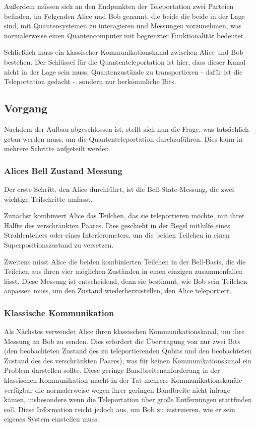Außerdem müssen sich an den Endpunkten der Teleportation zwei Parteien befinden, im Folgenden Alice und Bob genannt, die beide
die beide in der Lage sind, mit Quantensystemen zu interagieren und Messungen vorzunehmen, was normalerweise einen Quantencomputer mit begrenzter Funktionalität bedeutet.

Schließlich muss ein klassischer Kommunikationskanal zwischen Alice und Bob bestehen.
Der Schlüssel für die Quantenteleportation ist hier, dass dieser Kanal nicht in der Lage sein muss, Quantenzustände zu transportieren - dafür ist die Teleportation gedacht -, sondern nur herkömmliche Bits.


\subsection{Vorgang}\label{subsec:process}

Nachdem der Aufbau abgeschlossen ist, stellt sich nun die Frage, was tatsächlich getan werden muss, um die Quantenteleportation durchzuführen.
Dies kann in mehrere Schritte aufgeteilt werden.

\subsubsection{Alices Bell Zustand Messung}
Der erste Schritt, den Alice durchführt, ist die Bell-State-Messung, die zwei wichtige Teilschritte umfasst.

Zunächst kombiniert Alice das Teilchen, das sie teleportieren möchte, mit ihrer Hälfte des verschränkten Paares.
Dies geschieht in der Regel mithilfe eines Strahlenteilers oder eines Interferometers, um die beiden Teilchen in einen Superpositionszustand zu versetzen.

Zweitens misst Alice die beiden kombinierten Teilchen in der Bell-Basis, die die Teilchen aus ihren vier möglichen Zuständen in einen einzigen zusammenfallen lässt.
Diese Messung ist entscheidend, denn sie bestimmt, wie Bob sein Teilchen anpassen muss, um den Zustand wiederherzustellen, den
Alice teleportiert.
\subsubsection{Klassische Kommunikation}
Als Nächstes verwendet Alice ihren klassischen Kommunikationskanal, um ihre Messung an Bob zu senden.
Dies erfordert die Übertragung von nur zwei Bits (den beobachteten Zustand des zu teleportierenden Qubits und den beobachteten Zustand des
des verschränkten Paares), was für keinen Kommunikationskanal ein Problem darstellen sollte.
Diese geringe Bandbreitenanforderung in der klassischen Kommunikation macht in der Tat mehrere Kommunikationskanäle verfügbar
die normalerweise wegen ihrer geringen Bandbreite nicht infrage kämen, insbesondere wenn die Teleportation über große
Entfernungen stattfinden soll.
Diese Information reicht jedoch aus, um Bob zu instruieren, wie er sein eigenes System einstellen muss.
